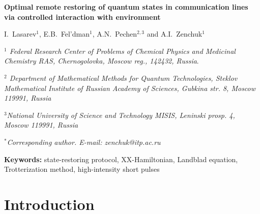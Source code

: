 \documentclass[pra,preprint,showpacs]{revtex4-1}
\begin{document}
\begin{center}
{\large \sc \bf {Optimal {{remote}} restoring of quantum states in communication lines via controlled interaction with environment}
}


\vskip 15pt

{\large
I.~Lasarev$^1$, E.B.~Fel'dman$^{1}$,  A.N.~Pechen$^{2,3}$ and  A.I.~Zenchuk$^{1}$
}

\vskip 8pt

{\it $^1$
Federal Research Center of Problems of Chemical Physics and Medicinal Chemistry RAS,
Chernogolovka, Moscow reg., 142432, Russia}.

{\it $^2$ Department of Mathematical Methods for Quantum Technologies, Steklov Mathematical Institute of Russian Academy of Sciences, Gubkina str. 8, Moscow 119991, Russia}

{\it $^3$National University of Science and Technology MISIS, Leninski prosp. 4, Moscow 119991, Russia}

{\it $^*$Corresponding author. E-mail:  zenchuk@itp.ac.ru}
\vskip 8pt

\end{center}
\date{\today}

\begin{abstract}

\end{abstract}

{\bf Keywords:} state-restoring protocol, XX-Hamiltonian, Landblad equation,  Trotterization method, high-intensity short pulses

\maketitle


\section{Introduction}
\label{Section:introduxtion}
\end{document}
